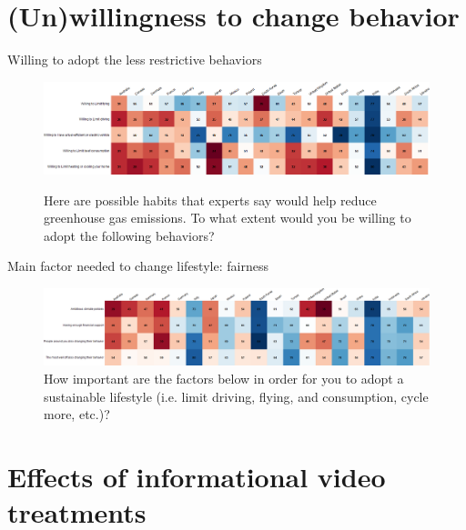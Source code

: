 			


\section{(Un)willingness to change behavior}
\begin{frame}{Willing to adopt the less restrictive behaviors}%
	\begin{figure}[h!]
	\centering
	\caption{Here are possible habits that experts say would help reduce greenhouse gas emissions.
	To what extent would you be willing to adopt the following behaviors?}
	\includegraphics[width=\textwidth]{../figures/country_comparison/willing_positive_countries.png} \\
	\end{figure}
\end{frame}
	
\begin{frame}{Main factor needed to change lifestyle: fairness}%
	\begin{figure}[h!]
	\centering
	\caption{How important are the factors below in order for you to adopt a sustainable lifestyle (i.e. limit driving, flying, and consumption, cycle more, etc.)?}
	\includegraphics[width=\textwidth]{../figures/country_comparison/condition_positive_countries.png}
	\end{figure}
\end{frame}
	

\section{Effects of informational video treatments}

